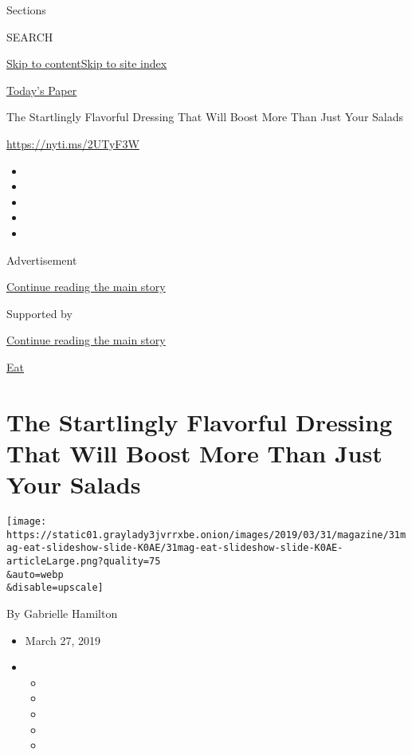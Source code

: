 Sections

SEARCH

\protect\hyperlink{site-content}{Skip to
content}\protect\hyperlink{site-index}{Skip to site index}

\href{https://myaccount.nytimes3xbfgragh.onion/auth/login?response_type=cookie\&client_id=vi}{}

\href{https://www.nytimes3xbfgragh.onion/section/todayspaper}{Today's
Paper}

The Startlingly Flavorful Dressing That Will Boost More Than Just Your
Salads

\url{https://nyti.ms/2UTyF3W}

\begin{itemize}
\item
\item
\item
\item
\item
\end{itemize}

Advertisement

\protect\hyperlink{after-top}{Continue reading the main story}

Supported by

\protect\hyperlink{after-sponsor}{Continue reading the main story}

\href{/column/magazine-eat}{Eat}

\hypertarget{the-startlingly-flavorful-dressing-that-will-boost-more-than-just-your-salads}{%
\section{The Startlingly Flavorful Dressing That Will Boost More Than
Just Your
Salads}\label{the-startlingly-flavorful-dressing-that-will-boost-more-than-just-your-salads}}

\texttt{[image: https://static01.graylady3jvrrxbe.onion/images/2019/03/31/magazine/31mag-eat-slideshow-slide-K0AE/31mag-eat-slideshow-slide-K0AE-articleLarge.png?quality=75\\\&auto=webp\\\&disable=upscale]}

By Gabrielle Hamilton

\begin{itemize}
\item
  March 27, 2019
\item
  \begin{itemize}
  \item
  \item
  \item
  \item
  \item
  \end{itemize}
\end{itemize}


